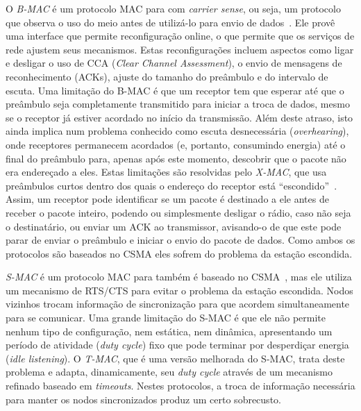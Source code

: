 O \emph{B-MAC} é um protocolo MAC para \rssf com \textit{carrier sense}, ou
seja, um protocolo que observa o uso do meio antes de utilizá-lo para envio de
dados~\cite{Polastre:2004}. Ele provê uma interface que permite reconfiguração
online, o que permite que os serviços de rede ajustem seus mecanismos. Estas
reconfigurações incluem aspectos como ligar e desligar o uso de CCA
(\textit{Clear Channel Assessment}), o envio de mensagens de reconhecimento
(ACKs), ajuste do tamanho do preâmbulo e do intervalo de escuta. Uma limitação
do B-MAC é que um receptor tem que esperar até que o preâmbulo seja
completamente transmitido para iniciar a troca de dados, mesmo se o receptor já
estiver acordado no início da transmissão. Além deste atraso, isto ainda implica
num problema conhecido como escuta desnecessária (\textit{overhearing}), onde
receptores permanecem acordados (e, portanto, consumindo energia) até o final do
preâmbulo para, apenas após este momento, descobrir que o pacote não era
endereçado a eles. Estas limitações são resolvidas pelo \emph{X-MAC}, que usa
preâmbulos curtos dentro dos quais o endereço do receptor está
``escondido''~\cite{Buettner:2006}. Assim, um receptor pode identificar se um
pacote é destinado a ele antes de receber o pacote inteiro, podendo ou
simplesmente desligar o rádio, caso não seja o destinatário, ou enviar um ACK ao
transmissor, avisando-o de que este pode parar de enviar o preâmbulo e iniciar o
envio do pacote de dados. Como ambos os protocolos são baseados no CSMA eles
sofrem do problema da estação escondida.

\emph{S-MAC} é um protocolo MAC para \rssf também é baseado no
CSMA~\cite{Ye:2002}, mas ele utiliza um mecanismo de RTS/CTS para evitar o
problema da estação escondida. Nodos vizinhos trocam informação de sincronização
para que acordem simultaneamente para se comunicar. Uma grande limitação do
S-MAC é que ele não permite nenhum tipo de configuração, nem estática, nem
dinâmica, apresentando um período de atividade (\textit{duty cycle}) fixo que
pode terminar por desperdiçar energia (\textit{idle listening}). O \emph{T-MAC},
que é uma versão melhorada do S-MAC, trata deste problema e adapta,
dinamicamente, seu \textit{duty cycle} através de um mecanismo refinado baseado
em \textit{timeouts}.
Nestes protocolos, a troca de informação necessária para manter os nodos
sincronizados produz um certo sobrecusto.

